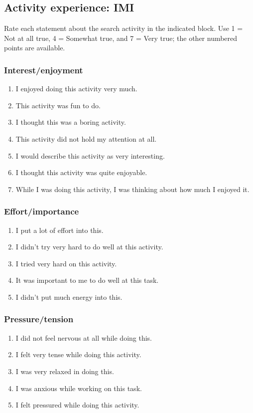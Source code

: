 \documentclass[11pt,letterpaper]{article}
\begin{document}
\subsection{Activity experience: IMI}
Rate each statement about the search activity in the indicated block. Use 1 = Not at all true, 4 = Somewhat true, and 7 = Very true; the other numbered points are available.
\subsubsection*{Interest/enjoyment}\label{imi1}
\begin{enumerate}
\item I enjoyed doing this activity very much.
\item This activity was fun to do.
\item I thought this was a boring activity.
\item This activity did not hold my attention at all.
\item I would describe this activity as very interesting.
\item I thought this activity was quite enjoyable.
\item While I was doing this activity, I was thinking about how much I enjoyed it.
\end{enumerate}
\subsubsection*{Effort/importance}\label{imi2}
\begin{enumerate}
\item I put a lot of effort into this.
\item I didn't try very hard to do well at this activity.
\item I tried very hard on this activity.
\item It was important to me to do well at this task.
\item I didn't put much energy into this.
\end{enumerate}
\subsubsection*{Pressure/tension}\label{imi3}
\begin{enumerate}
\item I did not feel nervous at all while doing this.
\item I felt very tense while doing this activity.
\item I was very relaxed in doing this.
\item I was anxious while working on this task.
\item I felt pressured while doing this activity.
\end{enumerate}
\end{document}
